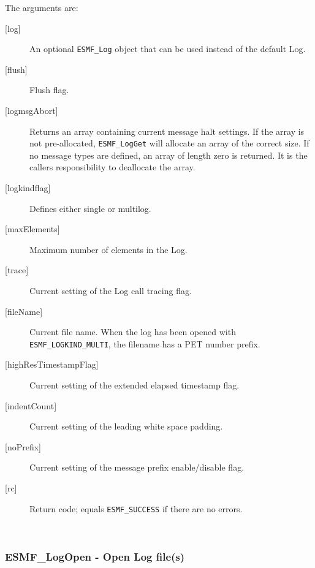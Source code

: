         The arguments are:
        \begin{description}
  
        \item [{[log]}]
              An optional {\tt ESMF\_Log} object that can be used instead
              of the default Log.
        \item [{[flush]}]
              Flush flag.
        \item [{[logmsgAbort]}]
              Returns an array containing current message halt settings.
              If the array is not pre-allocated, {\tt ESMF\_LogGet} will
              allocate an array of the correct size.  If no message types
              are defined, an array of length zero is returned.  It is the
              callers responsibility to deallocate the array.
        \item [{[logkindflag]}]
              Defines either single or multilog.
        \item [{[maxElements]}]
              Maximum number of elements in the Log.
        \item [{[trace]}]
              Current setting of the Log call tracing flag.
        \item [{[fileName]}]
              Current file name.  When the log has been opened with
              {\tt ESMF\_LOGKIND\_MULTI}, the filename has a PET number
              prefix.
        \item [{[highResTimestampFlag]}]
              Current setting of the extended elapsed timestamp flag.
        \item [{[indentCount]}]
              Current setting of the leading white space padding.
        \item [{[noPrefix]}]
              Current setting of the message prefix enable/disable flag.
        \item [{[rc]}]
              Return code; equals {\tt ESMF\_SUCCESS} if there are no errors.
        \end{description}
   
 
\mbox{}\hrulefill\ 
 
\subsubsection [ESMF\_LogOpen] {ESMF\_LogOpen - Open Log file(s)}


